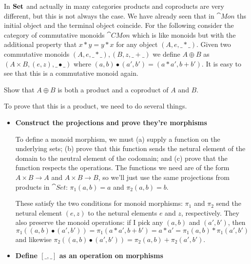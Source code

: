 In $\mathbf{Set}$ and actually in many categories products and coproducts are very different, but this is not always the case. We have already seen that in $\cat{Mon}$ ths initial object and the terminal object coincide. For the following consider the category of commutative monoids $\cat{CMon}$ which is like monoids but with the additional property that $x * y = y * x$ for any object $(A,e,\_*\_)$. Given two commutative monoids  $(A,e,\_*\_),  (B,z,\_+\_)$ we define $A \oplus B$ as $(A\times B,(e,z),\_ \bullet \_)$ where $(a,b) \bullet (a',b') = (a * a',b + b')$. It is easy to see that this is a commutative monoid again.
\begin{Exercise}
Show that $A \oplus B$ is both a product and a coproduct of $A$ and $B$.
\end{Exercise}
\begin{Answer}
  \Question
    To prove that this is a product, we need to do several things.
    \begin{itemize}
      \item \textbf{Construct the projections and prove they're morphisms}

        To define a monoid morphism, we must (a) supply a function on the underlying sets; (b) prove that this function sends the netural element of the domain to the neutral element of the codomain; and (c) prove that the function respects the operations. The functions we need are of the form $A\times B\to A$ and $A\times B\to B$, so we'll just use the same projections from products in $\cat{Set}$: $\pi_1(a,b)=a$ and $\pi_2(a,b)=b$.

        These satisfy the two conditions for monoid morphisms: $\pi_1$ and $\pi_2$ send the netural element $(e,z)$ to the netural elements $e$ and $z$, respectively. They also preserve the monoid operations: if I pick any $(a,b)$ and $(a',b')$, then
        \[ \pi_1((a,b)\bullet(a',b')) = \pi_1(a * a',b + b') = a * a' = \pi_1(a,b) * \pi_1(a',b') \]
        and likewise $\pi_2((a,b)\bullet(a',b'))=\pi_2(a,b) + \pi_2(a',b')$. 
      \item \textbf{Define $[\_,\_]$ as an operation on morphisms}


\end{itemize}
\end{Answer}
